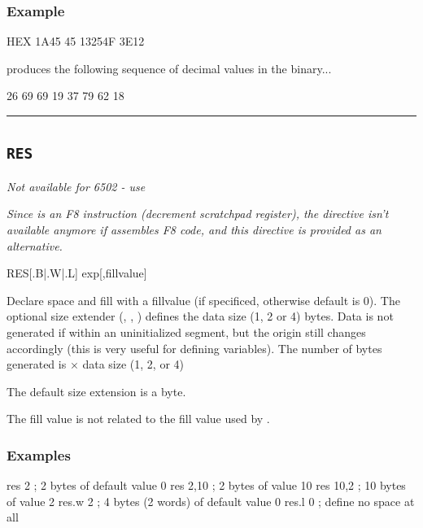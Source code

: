 \subsubsection{Example}
\begin{code}
 HEX 1A45 45 13254F 3E12
\end{code}

produces the following sequence of decimal values in the binary...

\begin{outputx}
26 69 69 19 37 79 62 18
\end{outputx}
	
\hrule
	
	
\subsection{\texttt{RES}}
\label{changelog:20200906res}
\label{pseudoop:res}	
	
\emph{Not available for 6502 - use }
	
\emph{Since  is an F8 instruction (decrement scratchpad register),
the  directive isn't available anymore if \dasm assembles
F8 code, and this  directive is provided as an alternative.
}


\begin{usage}
  RES[{.B|.W|.L}] exp[,fillvalue]
\end{usage}

Declare space and fill with a fillvalue (if specificed, otherwise default is 0). The optional size extender (, , ) defines the data size (1, 2 or 4) bytes. Data is not generated if within an uninitialized segment, but the origin still changes accordingly (this is very useful for defining variables).  The number of bytes generated is  $\times$ data size (1, 2, or 4)

The default size extension is a byte.

The fill value is not related to the fill value used by .


\subsubsection{Examples}

\begin{code}[caption=Declaring Space]
 res 2     ; 2 bytes of default value 0
 res 2,10  ; 2 bytes of value 10
 res 10,2  ; 10 bytes of value 2
 res.w 2   ; 4 bytes (2 words) of default value 0
 res.l 0   ; define no space at all
 \end{code}

